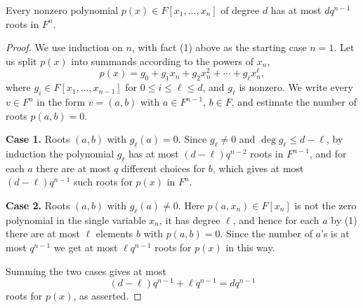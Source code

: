 \begin{lemma}
  \label{ch35lemma1}
  Every nonzero polynomial $p(x) \in F[x_1, \dots, x_n]$ of degree $d$ has at
  most $dq^{n-1}$ roots in $F^n$.
\end{lemma}
\begin{proof}
  We use induction on $n$, with fact (1) above as the starting case $n = 1$. Let us split $p(x)$ into
  summands according to the powers of $x_n$,
\[
p(x) = g_0 + g_1 x_n + g_2 x_n^2 + \cdots + g_\ell x_n^\ell,
\]
where $g_i \in F[x_1, \dots, x_{n-1}]$ for $0 \leq i \leq \ell \leq d$, and $g_\ell$ is nonzero.
We write every $v \in F^n$ in the form $v = (a, b)$ with $a \in F^{n-1}$, $b \in F$, and
estimate the number of roots $p(a, b) = 0$.

\textbf{Case 1.} Roots $(a, b)$ with $g_\ell(a) = 0$.
Since $g_\ell \neq 0$ and $\deg g_\ell \leq d - \ell$, by induction the polynomial $g_\ell$ has at
most $(d - \ell) q^{n-2}$ roots in $F^{n-1}$, and for each $a$ there are at most $q$ different
choices for $b$, which gives at most $(d - \ell)q^{n-1}$ such roots for $p(x)$ in $F^n$.

\textbf{Case 2.} Roots $(a, b)$ with $g_\ell(a) \neq 0$.
Here $p(a, x_n) \in F[x_n]$ is not the zero polynomial in the single variable $x_n$, it has degree
$\ell$, and hence for each $a$ by (1) there are at most $\ell$ elements $b$ with $p(a, b) = 0$. Since the number of $a$'s is at most $q^{n-1}$ we get at most $\ell q^{n-1}$ roots for $p(x)$ in this way.

Summing the two cases gives at most
\[
(d - \ell)q^{n-1} + \ell q^{n-1} = dq^{n-1}
\]
roots for $p(x)$, as asserted.
\end{proof}

